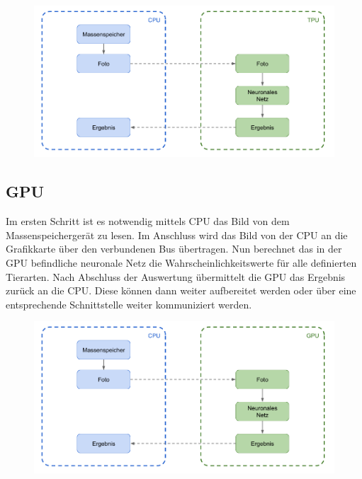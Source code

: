 \begin{figure}[htbp]
	\centering
		\includegraphics[width=1.00\textwidth]{BilderPDF/zielsetzung/System-TPU.png}
	\label{fig:System-TPU}
\end{figure}

\newpage


\subsection{GPU}

Im ersten Schritt ist es notwendig mittels CPU das Bild von dem Massenspeichergerät zu lesen. Im Anschluss wird das Bild von der CPU an die Grafikkarte über den verbundenen Bus übertragen. Nun berechnet das in der GPU befindliche neuronale Netz die Wahrscheinlichkeitswerte für alle definierten Tierarten. Nach Abschluss der Auswertung übermittelt die GPU das Ergebnis zurück an die CPU. Diese können dann weiter aufbereitet werden oder über eine entsprechende Schnittstelle weiter kommuniziert werden. 

\begin{figure}[htbp]
	\centering
		\includegraphics[width=1.00\textwidth]{BilderPDF/zielsetzung/System-GPU.png}
	\label{fig:System-GPU}
\end{figure}


